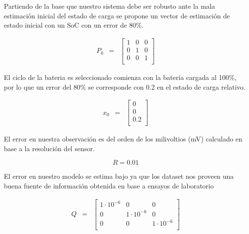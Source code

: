 \documentclass[10pt,a4paper]{article}
\begin{document}
Partiendo de la base que nuestro sistema debe ser robusto ante la mala
estimación inicial del estado de carga se propone un vector de estimación
de estado inicial con un SoC con un error de 80\%.

\begin{equation}
    \begin{array}{llll}
	P_0 & = & \begin{bmatrix}
	    1 & 0 & 0 \\
	    0 & 1 & 0 \\
	    0 & 0 & 1 \\
	\end{bmatrix} 
    \end{array} \nonumber
\end{equation}

\noindent El ciclo de la bateria es seleccionado comienza con la batería cargada
al 100\%, por lo que un error del 80\% se corresponde con 0.2 en el estado de
carga relativo.

\begin{equation}
    \begin{array}{llll}
	x_0 & = & \begin{bmatrix}
	    0 \\
	    0 \\
	    0.2 \\
	\end{bmatrix} 
    \end{array} \nonumber
\end{equation}

\noindent El error en nuestra observación es del orden de los milivoltios
(mV) calculado en base a la resolución del sensor.

\begin{equation}
    R = 0.01  \nonumber
\end{equation}

\noindent El error en nuestro modelo se estima bajo ya que los dataset nos 
proveen una buena fuente de información obtenida en base a ensayos de 
laboratorio

\begin{equation}
    \begin{array}{llll}
	Q & = & \begin{bmatrix}
	    1\cdot10^{-6} & 0 & 0 \\
	    0 & 1\cdot10^{-6} & 0 \\
	    0 & 0 & 1\cdot10^{-6} \\
	\end{bmatrix} 
    \end{array} \nonumber
\end{equation}
\end{document}
